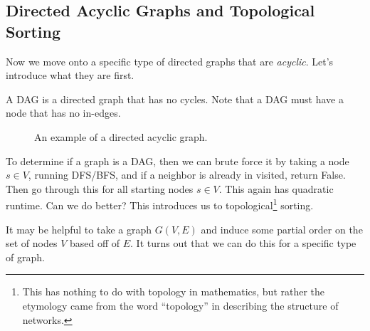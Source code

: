 \subsection{Directed Acyclic Graphs and Topological Sorting}

  Now we move onto a specific type of directed graphs that are \textit{acyclic}. Let's introduce what they are first. 

  \begin{definition}
    A DAG is a directed graph that has no cycles. Note that a DAG must have a node that has no in-edges. 

    \begin{figure}[H]
      \centering 
      \caption{An example of a directed acyclic graph.} 
      \label{fig:dag}
    \end{figure}
  \end{definition} 

  To determine if a graph is a DAG, then we can brute force it by taking a node $s \in V$, running DFS/BFS, and if a neighbor is already in visited, return False. Then go through this for all starting nodes $s \in V$. This again has quadratic runtime. Can we do better? This introduces us to topological\footnote{This has nothing to do with topology in mathematics, but rather the etymology came from the word ``topology'' in describing the structure of networks.} sorting. 

  It may be helpful to take a graph $G(V, E)$ and induce some partial order on the set of nodes $V$ based off of $E$. It turns out that we can do this for a specific type of graph. 
  
